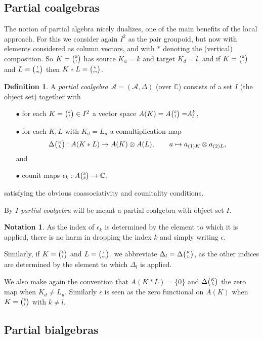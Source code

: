 \documentclass[11pt]{article}
\newcommand{\C}{\mathbb{C}}
\newcommand{\Grt}[3]{#1{\tiny {\begin{pmatrix} #2\\#3\end{pmatrix}}}}
\newcommand{\GrRA}[3]{#1^{#2}_{#3}} %
\newcommand{\Grru}[2]{{\tiny \begin{pmatrix} #1 \\ #2\end{pmatrix}}}
\newcommand{\bmult}{*}
\theoremstyle{definition}
\newtheorem{Def}[Theorem]{Definition}
\newtheorem{Not}[Theorem]{Notation}
\numberwithin{equation}{section}
\begin{document}
\subsection{Partial coalgebras}

The notion of partial algebra nicely dualizes, one of the main benefits of the local approach. For this we consider again $I^2$ as the pair groupoid, but now with elements considered as column vectors, and with $\bmult$ denoting the (vertical) composition. So $K=\Grt{}{k}{l}$ has source $K_u = k$ and target $K_d = l$, and if $K=\Grt{}{k}{l}$ and $L=\Grt{}{l}{m}$ then $K\bmult L = \Grt{}{k}{m}$.

\begin{Def} A \emph{partial coalgebra} $\mathscr{A}=(\mathscr{A},\Delta)$ (over $\C$) consists of a set $I$ (the object set) together with 
\begin{itemize}
\item[$\bullet$] for each $K=\Grru{k}{l}\in I^2$ a vector space $A(K) = \Grt{A}{k}{l}=\!\!\GrRA{A}{k}{l}$,
\item[$\bullet$] for each $K,L$ with $K_d = L_u$ a comultiplication map \[\Grt{\Delta}{K}{L}:A(K*L)\rightarrow A(K)\otimes A(L),\qquad a \mapsto a_{(1)K}\otimes a_{(2)L},\] and 
\item[$\bullet$] counit maps $\epsilon_k:\Grt{A}{k}{k}\rightarrow \C$,
\end{itemize} 
satisfying the obvious coassociativity and counitality conditions.

By \emph{$I$-partial coalgebra} will be meant a partial coalgebra with object set $I$.
\end{Def}

\begin{Not}\label{NotCom} As the index of $\epsilon_k$ is determined by the element to which it is applied, there is no harm in dropping the index $k$ and simply writing $\epsilon$.

Similarly, if $K = \Grt{}{k}{l}$ and $L = \Grt{}{l}{m}$, we abbreviate $\Delta_l = \Grt{\Delta}{K}{L}$, as the other indices are determined by the element to which $\Delta_l$ is applied.
\end{Not}

We also make again the convention that $A(K*L)=\{0\}$ and $\Grt{\Delta}{K}{L}$ the zero map when $K_d \neq L_u$. Similarly $\epsilon$ is seen as the zero functional on $A(K)$ when $K=\Grt{}{k}{l}$ with $k\neq l$. 

\subsection{Partial bialgebras}
\end{document}

